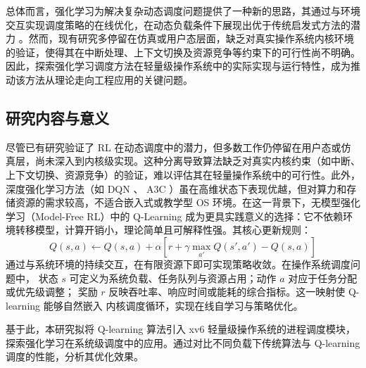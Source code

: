 总体而言，强化学习为解决复杂动态调度问题提供了一种新的思路，其通过与环境交互实现调度策略的在线优化，在动态负载条件下展现出优于传统启发式方法的潜力 。然而，现有研究多停留在仿真或用户态层面，缺乏对真实操作系统内核环境的验证，使得其在中断处理、上下文切换及资源竞争等约束下的可行性尚不明确。因此，探索强化学习调度方法在轻量级操作系统中的实际实现与运行特性，成为推动该方法从理论走向工程应用的关键问题。

\subsection{研究内容与意义}
尽管已有研究验证了 RL 在动态调度中的潜力，但多数工作仍停留在用户态或仿真层，尚未深入到内核级实现。这种分离导致算法缺乏对真实内核约束（如中断、上下文切换、资源竞争）的验证，难以评估其在轻量操作系统中的可行性。此外，深度强化学习方法（如 DQN 、 A3C ）虽在高维状态下表现优越，但对算力和存储资源的需求较高，不适合嵌入式或教学型 OS 环境。在这一背景下，无模型强化学习（Model-Free RL）中的 Q-Learning 成为更具实践意义的选择：它不依赖环境转移模型，计算开销小，理论简单且可解释性强。其核心更新规则：
\begin{equation}
Q(s,a) \leftarrow Q(s,a) + \alpha \left[r + \gamma \max_{a'} Q(s',a') - Q(s,a)\right]
\end{equation}
通过与系统环境的持续交互，在有限资源下即可实现策略收敛。在操作系统调度问题中，
状态 $s$ 可定义为系统负载、任务队列与资源占用；动作 $a$ 对应于任务分配或优先级调整；
奖励 $r$ 反映吞吐率、响应时间或能耗的综合指标。这一映射使 Q-learning 能够自然嵌入
内核调度循环，实现在线自学习与策略优化。
\begin{table}[htbp]
\centering
\caption{强化学习调度相关研究对比}

\end{table}
基于此，本研究拟将 Q-learning 算法引入 xv6 轻量级操作系统的进程调度模块，
探索强化学习在系统级调度中的应用。通过对比不同负载下传统算法与
Q-learning 调度的性能，分析其优化效果。